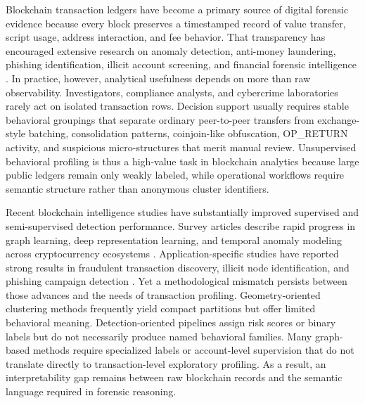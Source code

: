 \documentclass{ieeeaccess}
\begin{document}
Blockchain transaction ledgers have become a primary source of digital forensic evidence because every block preserves a timestamped record of value transfer, script usage, address interaction, and fee behavior. That transparency has encouraged extensive research on anomaly detection, anti-money laundering, phishing identification, illicit account screening, and financial forensic intelligence \cite{ref1,ref2,ref4,ref5}. In practice, however, analytical usefulness depends on more than raw observability. Investigators, compliance analysts, and cybercrime laboratories rarely act on isolated transaction rows. Decision support usually requires stable behavioral groupings that separate ordinary peer-to-peer transfers from exchange-style batching, consolidation patterns, coinjoin-like obfuscation, OP\_RETURN activity, and suspicious micro-structures that merit manual review. Unsupervised behavioral profiling is thus a high-value task in blockchain analytics because large public ledgers remain only weakly labeled, while operational workflows require semantic structure rather than anonymous cluster identifiers.

Recent blockchain intelligence studies have substantially improved supervised and semi-supervised detection performance. Survey articles describe rapid progress in graph learning, deep representation learning, and temporal anomaly modeling across cryptocurrency ecosystems \cite{ref1,ref2,ref3}. Application-specific studies have reported strong results in fraudulent transaction discovery, illicit node identification, and phishing campaign detection \cite{ref5,ref8,ref19,ref27,ref35}. Yet a methodological mismatch persists between those advances and the needs of transaction profiling. Geometry-oriented clustering methods frequently yield compact partitions but offer limited behavioral meaning. Detection-oriented pipelines assign risk scores or binary labels but do not necessarily produce named behavioral families. Many graph-based methods require specialized labels or account-level supervision that do not translate directly to transaction-level exploratory profiling. As a result, an interpretability gap remains between raw blockchain records and the semantic language required in forensic reasoning.
\end{document}
